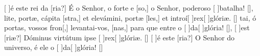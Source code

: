 {    {[ ]{é} este rei da [ria?] É o Senhor, o forte e [so,] o Senhor, poderoso [ ]{ba}{ta}lha! [\LinkPT]},
  {lite, portæ, cápita [stra,] et elevámini, portæ [les,] et introí[ ]{rex}[ ]{gló}riæ. [\LinkLA]}%
    {tai, ó portas, vossos fron[,] levantai-vos, [nas,] para que entre o [ ]{da}[ ]{gló}ria! [\LinkPT]},
  {[ ]{est} [riæ?] Dóminus virtútum ipse [ ]{rex}[ ]{gló}riæ. [\LinkLA]}%
    {[ ]{é} este [ria?] O Senhor do universo, é ele o [ ]{da}[ ]{gló}ria! [\LinkPT]}
}